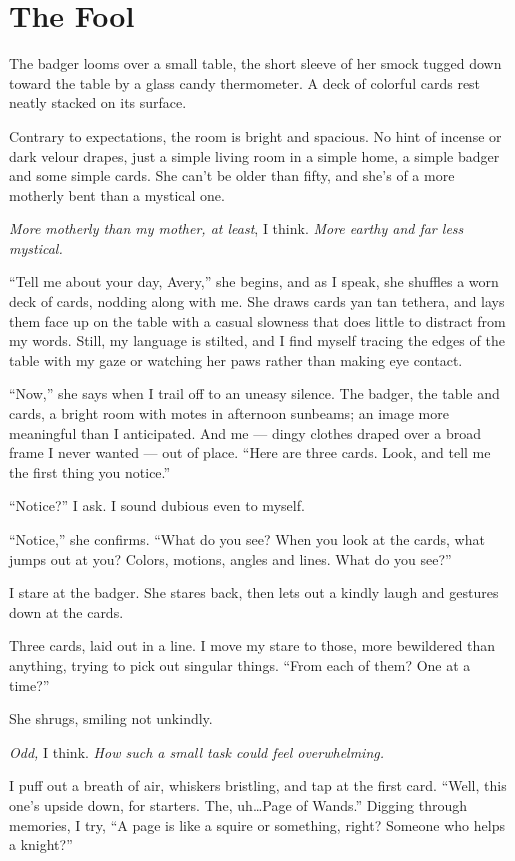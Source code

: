 \chapter{The Fool}\label{the-fool}

The badger looms over a small table, the short sleeve of her smock tugged down toward the table by a glass candy thermometer. A deck of colorful cards rest neatly stacked on its surface.

Contrary to expectations, the room is bright and spacious. No hint of incense or dark velour drapes, just a simple living room in a simple home, a simple badger and some simple cards. She can't be older than fifty, and she's of a more motherly bent than a mystical one.

\emph{More motherly than my mother, at least}, I think. \emph{More earthy and far less mystical.}

``Tell me about your day, Avery,'' she begins, and as I speak, she shuffles a worn deck of cards, nodding along with me. She draws cards yan tan tethera, and lays them face up on the table with a casual slowness that does little to distract from my words. Still, my language is stilted, and I find myself tracing the edges of the table with my gaze or watching her paws rather than making eye contact.

``Now,'' she says when I trail off to an uneasy silence. The badger, the table and cards, a bright room with motes in afternoon sunbeams; an image more meaningful than I anticipated. And me --- dingy clothes draped over a broad frame I never wanted --- out of place. ``Here are three cards. Look, and tell me the first thing you notice.''

``Notice?'' I ask. I sound dubious even to myself.

``Notice,'' she confirms. ``What do you see? When you look at the cards, what jumps out at you? Colors, motions, angles and lines. What do you see?''

I stare at the badger. She stares back, then lets out a kindly laugh and gestures down at the cards.

Three cards, laid out in a line. I move my stare to those, more bewildered than anything, trying to pick out singular things. ``From each of them? One at a time?''

She shrugs, smiling not unkindly.

\emph{Odd,} I think. \emph{How such a small task could feel overwhelming.}

I puff out a breath of air, whiskers bristling, and tap at the first card. ``Well, this one's upside down, for starters. The, uh\ldots{}Page of Wands.'' Digging through memories, I try, ``A page is like a squire or something, right? Someone who helps a knight?''

